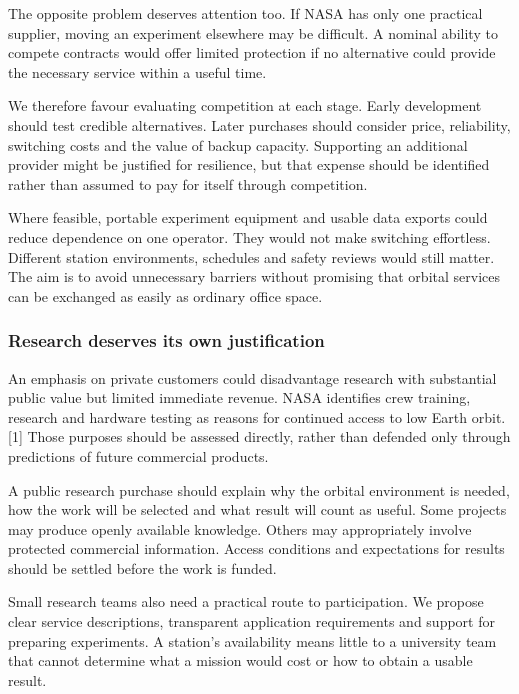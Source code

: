 \documentclass[11pt,letterpaper]{article}
\begin{document}
The opposite problem deserves attention too. If NASA has only one
practical supplier, moving an experiment elsewhere may be difficult. A
nominal ability to compete contracts would offer limited protection if
no alternative could provide the necessary service within a useful time.

We therefore favour evaluating competition at each stage. Early
development should test credible alternatives. Later purchases should
consider price, reliability, switching costs and the value of backup
capacity. Supporting an additional provider might be justified for
resilience, but that expense should be identified rather than assumed to
pay for itself through competition.

Where feasible, portable experiment equipment and usable data exports
could reduce dependence on one operator. They would not make switching
effortless. Different station environments, schedules and safety reviews
would still matter. The aim is to avoid unnecessary barriers without
promising that orbital services can be exchanged as easily as ordinary
office space.

\hypertarget{research-deserves-its-own-justification}{%
\subsubsection{Research deserves its own
justification}\label{research-deserves-its-own-justification}}

An emphasis on private customers could disadvantage research with
substantial public value but limited immediate revenue. NASA identifies
crew training, research and hardware testing as reasons for continued
access to low Earth orbit.{[}1{]} Those purposes should be assessed
directly, rather than defended only through predictions of future
commercial products.

A public research purchase should explain why the orbital environment is
needed, how the work will be selected and what result will count as
useful. Some projects may produce openly available knowledge. Others may
appropriately involve protected commercial information. Access
conditions and expectations for results should be settled before the
work is funded.

Small research teams also need a practical route to participation. We
propose clear service descriptions, transparent application requirements
and support for preparing experiments. A station's availability means
little to a university team that cannot determine what a mission would
cost or how to obtain a usable result.
\end{document}

